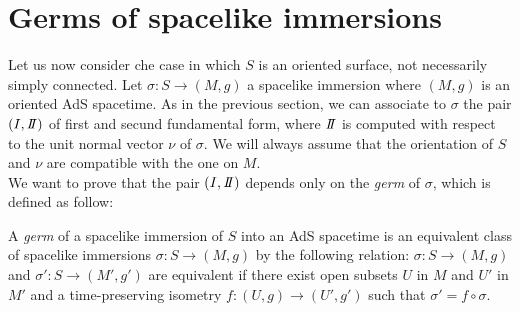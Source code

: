 \section{Germs of spacelike immersions}
Let us now consider che case in which $S$ is an oriented surface, not necessarily simply connected. Let $\sigma: S \to(M,g)$ a spacelike immersion where $(M,g)$ is an oriented AdS spacetime.
As in the previous section, we can associate to $\sigma$ the pair $(\I,\II)$ of first and secund fundamental form, where $\II$ is  computed with respect to the unit normal vector $\nu$ of $\sigma$.
We will always assume that the orientation of $S$ and $\nu$ are compatible with the one on $M$.\\
We want to prove that the pair $(\I,\II)$ depends only on the \textit{germ} of $\sigma$, which is defined as follow:
\begin{definition}
    A \textit{germ} of a spacelike immersion of $S$ into an AdS spacetime is an equivalent class of spacelike immersions $\sigma:S \to(M,g)$ by the following relation: $\sigma:S \to(M,g)$ and $\sigma':S \to(M',g')$ are equivalent if there exist open subsets $U$ in $M$ and $U'$ in $M'$ and a time-preserving isometry $f:(U,g)\to(U',g')$ such that $\sigma' = f \circ \sigma$.
\end{definition}